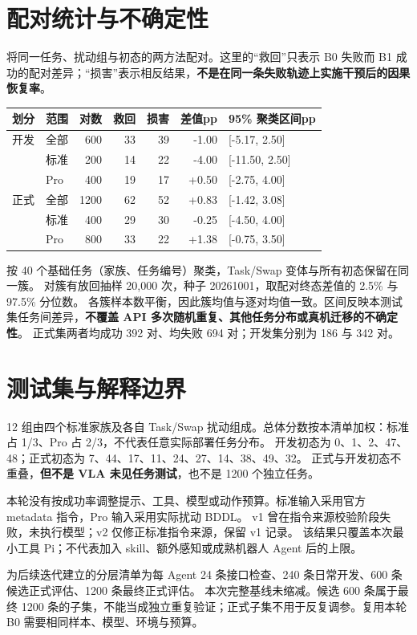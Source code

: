 \documentclass[UTF8,11pt,a4paper]{ctexart}
\begin{document}
\section{配对统计与不确定性}
将同一任务、扰动组与初态的两方法配对。这里的“救回”只表示 B0 失败而 B1 成功的配对差异；“损害”表示相反结果，\textbf{不是在同一条失败轨迹上实施干预后的因果恢复率}。

\begin{center}\small
\begin{tabular}{llrrrrl}
\toprule
划分 & 范围 & 对数 & 救回 & 损害 & 差值pp & 95\% 聚类区间pp\\
\midrule
开发 & 全部 & 600 & 33 & 39 & -1.00 & [-5.17, 2.50]\\
 & 标准 & 200 & 14 & 22 & -4.00 & [-11.50, 2.50]\\
 & Pro & 400 & 19 & 17 & +0.50 & [-2.75, 4.00]\\
正式 & 全部 & 1200 & 62 & 52 & +0.83 & [-1.42, 3.08]\\
 & 标准 & 400 & 29 & 30 & -0.25 & [-4.50, 4.00]\\
 & Pro & 800 & 33 & 22 & +1.38 & [-0.75, 3.50]\\
\bottomrule
\end{tabular}
\end{center}
按 40 个基础任务（家族、任务编号）聚类，Task/Swap 变体与所有初态保留在同一簇。
对簇有放回抽样 20,000 次，种子 20261001，取配对终态差值的 2.5\% 与 97.5\% 分位数。
各簇样本数平衡，因此簇均值与逐对均值一致。区间反映本测试集任务间差异，\textbf{不覆盖 API 多次随机重复、其他任务分布或真机迁移的不确定性}。
正式集两者均成功 392 对、均失败 694 对；开发集分别为 186 与 342 对。

\section{测试集与解释边界}
12 组由四个标准家族及各自 Task/Swap 扰动组成。总体分数按本清单加权：标准占 1/3、Pro 占 2/3，不代表任意实际部署任务分布。
开发初态为 0、1、2、47、48；正式初态为 7、44、17、11、24、27、14、38、49、32。
正式与开发初态不重叠，\textbf{但不是 VLA 未见任务测试}，也不是 1200 个独立任务。

本轮没有按成功率调整提示、工具、模型或动作预算。标准输入采用官方 metadata 指令，Pro 输入采用实际扰动 BDDL。
v1 曾在指令来源校验阶段失败，未执行模型；v2 仅修正标准指令来源，保留 v1 记录。
该结果只覆盖本次最小工具 Pi；不代表加入 skill、额外感知或成熟机器人 Agent 后的上限。

为后续迭代建立的分层清单为每 Agent 24 条接口检查、240 条日常开发、600 条候选正式评估、1200 条最终正式评估。
本次完整基线未缩减。候选 600 条属于最终 1200 条的子集，不能当成独立重复验证；正式子集不用于反复调参。复用本轮 B0 需要相同样本、模型、环境与预算。
\newpage
\end{document}
